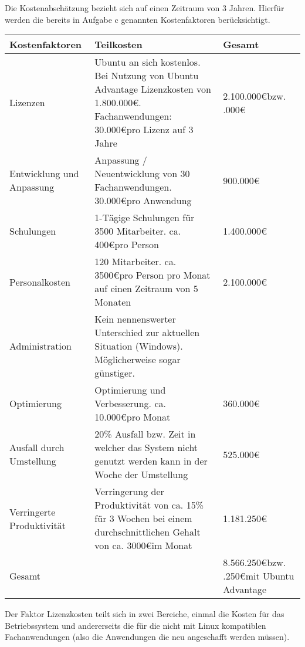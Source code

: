 \documentclass[12pt,utf8]{scrartcl}
\begin{document}
Die Kostenabschätzung bezieht sich auf einen Zeitraum von 3 Jahren. Hierfür werden die bereits in Aufgabe c genannten Kostenfaktoren berücksichtigt.

\begin{table}[h]
\begin{tabular}{|p{5cm}|p{8cm}|p{2cm}|}
\hline
Kostenfaktoren & Teilkosten & Gesamt \\
\hline
Lizenzen & Ubuntu an sich kostenlos. Bei Nutzung von Ubuntu Advantage Lizenzkosten von 1.800.000\euro . \newline 70 Fachanwendungen: 30.000\euro \space pro Lizenz auf 3 Jahre & 2.100.000\euro \newline bzw. \newline 3.900.000\euro \\
\hline
Entwicklung und Anpassung & Anpassung / Neuentwicklung von 30 Fachanwendungen. 30.000\euro \space pro Anwendung & 900.000\euro \\
\hline
Schulungen & 1-Tägige Schulungen für 3500 Mitarbeiter. ca. 400\euro \space pro Person & 1.400.000\euro \\
\hline
Personalkosten & 120 Mitarbeiter. ca. 3500\euro \space pro Person pro Monat auf einen Zeitraum von 5 Monaten & 2.100.000\euro \\
\hline
Administration & Kein nennenswerter Unterschied zur aktuellen Situation (Windows). Möglicherweise sogar günstiger. & \\
\hline
Optimierung & Optimierung und Verbesserung. ca. 10.000\euro pro Monat & 360.000\euro \\
\hline
Ausfall durch Umstellung & 20\% Ausfall bzw. Zeit in welcher das System nicht genutzt werden kann in der Woche der Umstellung & 525.000\euro \\
\hline
Verringerte Produktivität & Verringerung der Produktivität von ca. 15\% für 3 Wochen bei einem durchschnittlichen Gehalt von ca. 3000\euro \space im Monat & 1.181.250\euro \\
\hline
Gesamt & & 8.566.250\euro \newline bzw. \newline 10.366.250\euro \space mit Ubuntu Advantage \\
\hline
\end{tabular}
\end{table}

Der Faktor Lizenzkosten teilt sich in zwei Bereiche, einmal die Kosten für das Betriebssystem und andererseits die für die nicht mit Linux kompatiblen Fachanwendungen (also die Anwendungen die neu angeschafft werden müssen). 
\end{document}
